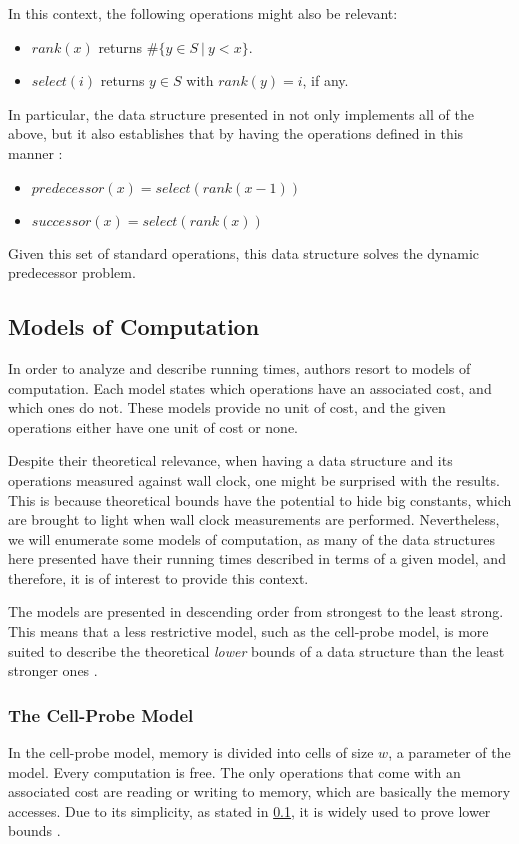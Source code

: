 In this context, the following operations might also be relevant:
\begin{itemize}
    \item
    $rank(x)$ returns $\#\{ y \in S\ |\ y < x\}$.
    \item
    $select(i)$ returns $y \in S$ with $rank(y) = i$, if any.
\end{itemize}

In particular, the data structure presented in \cite{patrascu2014dynamic} not only implements all of the above, but it also establishes that by having the operations defined in this manner \cite{patrascu2014dynamic}:
\begin{itemize}
    \item
    $predecessor(x) = select(rank(x - 1))$
    \item
    $successor(x) = select(rank(x))$
\end{itemize}

Given this set of standard operations, this data structure solves the dynamic predecessor problem.

\subsection{Models of Computation}\label{sec:modelsofcomputation}

In order to analyze and describe running times, authors resort to models of computation. Each model states which operations have an associated cost, and which ones do not.
These models provide no unit of cost, and the given operations either have one unit of cost or none.

Despite their theoretical relevance, when having a data structure and its operations measured against wall clock, one might be surprised with the results.
This is because theoretical bounds have the potential to hide big constants, which are brought to light when wall clock measurements are performed.
Nevertheless, we will enumerate some models of computation, as many of the data structures here presented have their running times described in terms of a given model, and therefore, it is of interest to provide this context.

The models are presented in descending order from strongest to the least strong. This means that a less restrictive model, such as the cell-probe model, is more suited to describe the theoretical \emph{lower} bounds of a data structure than the least stronger ones \cite{erikdemainelec11}.

\subsubsection{The Cell-Probe Model}
In the cell-probe model, memory is divided into cells of size $w$, a parameter of the model. Every computation is free.
The only operations that come with an associated cost are reading or writing to memory, which are basically the memory accesses.
Due to its simplicity, as stated in \ref{sec:modelsofcomputation}, it is widely used to prove lower bounds \cite{erikdemainelec11}.


